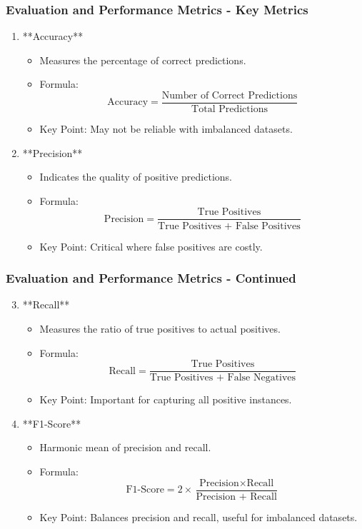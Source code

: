 \documentclass[aspectratio=169]{beamer}
\begin{document}
\begin{frame}[fragile]
    \frametitle{Evaluation and Performance Metrics - Key Metrics}
    \begin{enumerate}
        \item **Accuracy**
        \begin{itemize}
            \item Measures the percentage of correct predictions.
            \item Formula: 
            \[
            \text{Accuracy} = \frac{\text{Number of Correct Predictions}}{\text{Total Predictions}}
            \]
            \item Key Point: May not be reliable with imbalanced datasets.
        \end{itemize}
        
        \item **Precision**
        \begin{itemize}
            \item Indicates the quality of positive predictions.
            \item Formula:
            \[
            \text{Precision} = \frac{\text{True Positives}}{\text{True Positives + False Positives}}
            \]
            \item Key Point: Critical where false positives are costly.
        \end{itemize}
    \end{enumerate}
\end{frame}

\begin{frame}[fragile]
    \frametitle{Evaluation and Performance Metrics - Continued}
    \begin{enumerate}
        \setcounter{enumi}{2} %
        \item **Recall**
        \begin{itemize}
            \item Measures the ratio of true positives to actual positives.
            \item Formula:
            \[
            \text{Recall} = \frac{\text{True Positives}}{\text{True Positives + False Negatives}}
            \]
            \item Key Point: Important for capturing all positive instances.
        \end{itemize}
        
        \item **F1-Score**
        \begin{itemize}
            \item Harmonic mean of precision and recall.
            \item Formula:
            \[
            \text{F1-Score} = 2 \times \frac{\text{Precision} \times \text{Recall}}{\text{Precision + Recall}}
            \]
            \item Key Point: Balances precision and recall, useful for imbalanced datasets.
        \end{itemize}
    \end{enumerate}
\end{frame}
\end{document}

